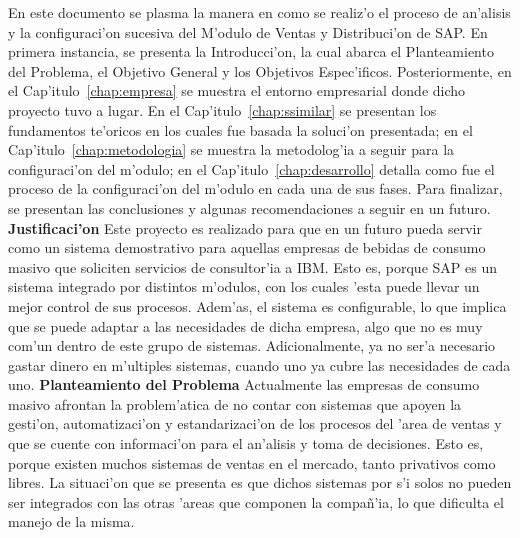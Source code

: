 \newline
\newline
\indent En este documento se plasma la manera en como se realiz'o el proceso de an'alisis y la configuraci'on sucesiva del M'odulo de Ventas y Distribuci'on de SAP. En primera instancia, se presenta la Introducci'on, la cual abarca el Planteamiento del Problema, el Objetivo General y los Objetivos Espec'ificos. Posteriormente, en el Cap'itulo~\ref{chap:empresa} se muestra el entorno empresarial donde dicho proyecto tuvo a lugar. En el Cap'itulo~\ref{chap:ssimilar} se presentan los fundamentos te'oricos en los cuales fue basada la soluci'on presentada; en el Cap'itulo~\ref{chap:metodologia} se muestra la metodolog'ia a seguir para la configuraci'on del m'odulo; en el Cap'itulo~\ref{chap:desarrollo} detalla como fue el proceso de la configuraci'on del m'odulo en cada una de sus fases. Para finalizar, se presentan las conclusiones y algunas recomendaciones a seguir en un futuro.
\newline
\newline
\label{sect:justificacion}
\textbf{Justificaci'on}
\newline
\newline
\indent Este proyecto es realizado para que en un futuro pueda servir como un sistema demostrativo para aquellas empresas de bebidas de consumo masivo que soliciten servicios de consultor'ia a IBM. Esto es, porque SAP es un sistema integrado por distintos m'odulos, con los cuales 'esta puede llevar un mejor control de sus procesos. Adem'as, el sistema es configurable, lo que implica que se puede adaptar a las necesidades de dicha empresa, algo que no es muy com'un dentro de este grupo de sistemas. Adicionalmente, ya no ser'a necesario gastar dinero en m'ultiples sistemas, cuando uno ya cubre las necesidades de cada uno.
\label{sect:planteamiento}
\newline
\newline
\newline
\textbf{Planteamiento del Problema}
\newline
\newline
\indent Actualmente las empresas de consumo masivo afrontan la problem'atica de no  contar con sistemas que apoyen la gesti'on, automatizaci'on y estandarizaci'on de los procesos del 'area de ventas y que se cuente con informaci'on para el an'alisis y toma de decisiones. Esto es, porque  existen muchos sistemas de ventas en el mercado, tanto privativos como libres. La situaci'on que se presenta es que dichos sistemas por s'i solos no pueden ser integrados con las otras 'areas que componen la compa\~n'ia, lo que dificulta el manejo de la misma. 
		
